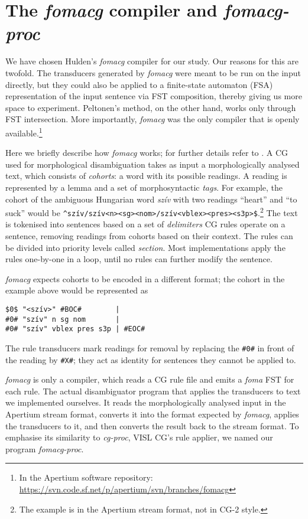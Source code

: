 \documentclass[11pt]{article}
\begin{document}
\section{The \emph{fomacg} compiler and \emph{fomacg-proc}}
\label{sec:fomacg}

We have chosen Hulden's \emph{fomacg} compiler for our study. Our
reasons for this are twofold. The transducers generated by \emph{fomacg} were
meant to be run on the input directly, but they could also be applied to a
finite-state automaton (FSA) representation of the input sentence via FST
composition, thereby giving us more space to experiment. Peltonen's method,
on the other hand, works only through FST intersection. More importantly,
\emph{fomacg} was the only compiler that is openly
available.\footnote{In the Apertium software repository:
\url{https://svn.code.sf.net/p/apertium/svn/branches/fomacg}}

Here we briefly describe how \emph{fomacg} works; for further details refer to
\cite{Hulden:2011}. A CG used for morphological disambiguation takes as input
a morphologically analysed text, which consists of \emph{cohorts}: a word with
its possible readings. A reading is
represented by a lemma and a set of morphosyntactic \emph{tags}. For example, the cohort of
the ambiguous Hungarian word \textit{szív} with two readings ``heart'' and
``to suck'' would be
\texttt{\^{}szív/szív<n><sg><nom>/szív<vblex><pres><s3p>\$}.\footnote{
The example is in the Apertium stream format, not in CG-2 style.} The text is
tokenised into sentences based on a set of \emph{delimiters} CG rules
operate on a sentence, removing readings from cohorts based on their context.
The rules can be divided into priority levels called \emph{section}. Most
implementations apply the rules one-by-one in a loop, until no rules can further
modify the sentence.

\emph{fomacg} expects cohorts to be encoded in a different format; the cohort in
the example above would be represented as
\begin{verbatim}
$0$ "<szív>" #BOC#        |
#0# "szív" n sg nom       |
#0# "szív" vblex pres s3p | #EOC#
\end{verbatim}
The rule transducers mark readings for removal by replacing the \texttt{\#0\#}
in front of the reading by \texttt{\#X\#}; they act as identity for sentences
they cannot be applied to.

\emph{fomacg} is only a compiler, which reads a CG rule file and emits a
\emph{foma} FST for each rule. The actual disambiguator program that applies the
transducers to text we implemented ourselves. It reads the morphologically
analysed input in the Apertium stream format, converts it into the format
expected by \emph{fomacg}, applies the transducers to it, and then converts the
result back to the stream format. To emphasise its similarity to \emph{cg-proc},
VISL CG's rule applier, we named our program \emph{fomacg-proc}.
\end{document}
